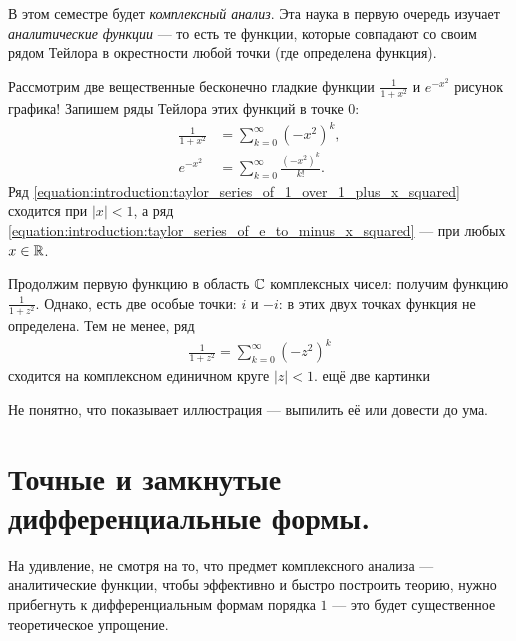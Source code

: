 В этом семестре будет \textit{комплексный анализ}. Эта наука в первую очередь изучает \textit{аналитические функции} --- то есть те функции, которые совпадают со своим рядом Тейлора в окрестности любой точки (где определена функция).

Рассмотрим две вещественные бесконечно гладкие функции $\frac{1}{1+x^{2}}$ и $e^{-x^{2}}$ {\color{red} рисунок графика!} Запишем ряды Тейлора этих функций в точке $0$:
\begin{align}
 \label{equation:introduction:taylor_series_of_1_over_1_plus_x_squared}
 \frac{1}{1+x^{2}} &= \sum_{k=0}^{\infty} (-x^{2})^{k}, \\
 \label{equation:introduction:taylor_series_of_e_to_minus_x_squared}
 e^{-x^{2}} &= \sum_{k=0}^{\infty}  \frac{(-x^{2})^{k}}{k!}.
\end{align} Ряд \eqref{equation:introduction:taylor_series_of_1_over_1_plus_x_squared} сходится при $\left| x \right| < 1$, а ряд \eqref{equation:introduction:taylor_series_of_e_to_minus_x_squared} --- при любых $x \in \mathbb{R}$.

Продолжим первую функцию в область $\mathbb{C}$ комплексных чисел: получим функцию $\frac{1}{1 + z^{2}}$. Однако, есть две особые точки: $i$ и $-i$: в этих двух точках функция не определена. Тем не менее, ряд \begin{align*}
 \frac{1}{1+z^{2}} = \sum_{k=0}^{\infty} (-z^{2})^{k}
\end{align*}  сходится на комплексном единичном круге $\left| z \right| < 1$. {\color{red} ещё две картинки}

{\color{red} Не понятно, что показывает иллюстрация --- выпилить её или довести до ума.}

\section{Точные и замкнутые дифференциальные формы.}

На удивление, не смотря на то, что предмет комплексного анализа --- аналитические функции, чтобы эффективно и быстро построить теорию, нужно прибегнуть к дифференциальным формам порядка $1$ --- это будет существенное теоретическое упрощение.

